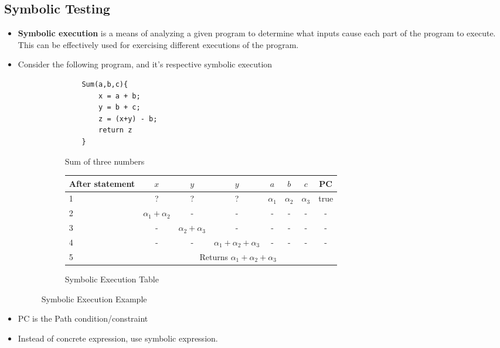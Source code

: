 \documentclass[a4paper]{article}
\begin{document}
\subsection{Symbolic Testing}
\begin{itemize}
    \item \textbf{Symbolic execution} is a means of analyzing a given program to determine what inputs cause each part of the program to execute. This can be effectively used for exercising different executions of the program.
    \item Consider the following program, and it's respective symbolic execution
    \begin{figure}[H]
        \centering
        \begin{subfigure}[b]{0.20\textwidth}
            \centering
            \begin{verbatim}
    Sum(a,b,c){
        x = a + b;
        y = b + c;
        z = (x+y) - b;
        return z
    }
            \end{verbatim}
            \caption{Sum of three numbers}
        \end{subfigure}
        \hfill
        \begin{subfigure}[b]{0.70\textwidth}
            \begin{tabular}{||l|c|c|c|c|c|c|c||}
                \hline
               After statement  & $x$ & $y$ & $y$ & $a$ & $b$ & $c$ & PC \\
               \hline
               1 & ? & ? & ? & $\alpha_1$ & $\alpha_2$ & $\alpha_3$ & true \\
               2 & $\alpha_1+\alpha_2$ & - & - & - & - & - & -\\
               3 & - & $\alpha_2+\alpha_3$ & - & - & - & - & -\\
               4 & - & - & $\alpha_1+\alpha_2+\alpha_3$ & - & - & - & -\\
               \cline{2-8}
               5 & \multicolumn{7}{c||}{Returns $\alpha_1+\alpha_2+\alpha_3$}\\
               \hline
            \end{tabular}
            \caption{Symbolic Execution Table}
        \end{subfigure}
        \caption{Symbolic Execution Example}
        \label{fig:enter-label}
    \end{figure}
    \item PC is the Path condition/constraint
    \item Instead of concrete expression, use symbolic expression.

\end{itemize}
\end{document}
